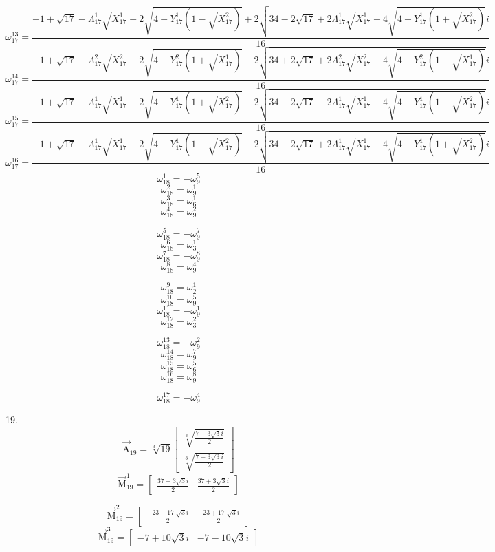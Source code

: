 \documentclass{article}
\begin{document}
\[ \omega_{17}^{13}=\frac{-1+\sqrt{17}+\Lambda_{17}^{1}\sqrt{X_{17}^{1}}-2\sqrt{4+Y_{17}^{1}(1-\sqrt{X_{17}^{2}})}+2\sqrt{34-2\sqrt{17}+2\Lambda_{17}^{1}\sqrt{X_{17}^{1}}-4\sqrt{4+Y_{17}^{1}(1+\sqrt{X_{17}^{2}})}}i}{16} \]
\[ \omega_{17}^{14}=\frac{-1+\sqrt{17}+\Lambda_{17}^{2}\sqrt{X_{17}^{2}}+2\sqrt{4+Y_{17}^{2}(1+\sqrt{X_{17}^{1}})}-2\sqrt{34+2\sqrt{17}+2\Lambda_{17}^{2}\sqrt{X_{17}^{2}}-4\sqrt{4+Y_{17}^{2}(1-\sqrt{X_{17}^{1}})}}i}{16} \]
\[ \omega_{17}^{15}=\frac{-1+\sqrt{17}-\Lambda_{17}^{1}\sqrt{X_{17}^{1}}+2\sqrt{4+Y_{17}^{1}(1+\sqrt{X_{17}^{2}})}-2\sqrt{34-2\sqrt{17}-2\Lambda_{17}^{1}\sqrt{X_{17}^{1}}+4\sqrt{4+Y_{17}^{1}(1-\sqrt{X_{17}^{2}})}}i}{16} \]
\[ \omega_{17}^{16}=\frac{-1+\sqrt{17}+\Lambda_{17}^{1}\sqrt{X_{17}^{1}}+2\sqrt{4+Y_{17}^{1}(1-\sqrt{X_{17}^{2}})}-2\sqrt{34-2\sqrt{17}+2\Lambda_{17}^{1}\sqrt{X_{17}^{1}}+4\sqrt{4+Y_{17}^{1}(1+\sqrt{X_{17}^{2}})}}i}{16} \]
\[ \omega_{18}^{1}=-\omega_{9}^{5} \]
\[ \omega_{18}^{2}=\omega_{9}^{1} \]
\[ \omega_{18}^{3}=\omega_{6}^{1} \]
\[ \omega_{18}^{4}=\omega_{9}^{2} \]

\[ \omega_{18}^{5}=-\omega_{9}^{7} \]
\[ \omega_{18}^{6}=\omega_{3}^{1} \]
\[ \omega_{18}^{7}=-\omega_{9}^{8} \]
\[ \omega_{18}^{8}=\omega_{9}^{4} \]

\[ \omega_{18}^{9}=\omega_{2}^{1} \]
\[ \omega_{18}^{10}=\omega_{9}^{5} \]
\[ \omega_{18}^{11}=-\omega_{9}^{1} \]
\[ \omega_{18}^{12}=\omega_{3}^{2} \]

\[ \omega_{18}^{13}=-\omega_{9}^{2} \]
\[ \omega_{18}^{14}=\omega_{9}^{7} \]
\[ \omega_{18}^{15}=\omega_{6}^{5} \]
\[ \omega_{18}^{16}=\omega_{9}^{8} \]

\[ \omega_{18}^{17}=-\omega_{9}^{4} \]

19.
\[ \vec{\mathrm{A}}_{19}=\sqrt[3]{19}\left[ \begin{matrix} \sqrt[3]{\frac{7+3\sqrt{3}i}{2}} \\ \sqrt[3]{\frac{7-3\sqrt{3}i}{2}} \end{matrix} \right] \]
\[ \vec{\mathrm{M}}_{19}^{1}=\left[ \begin{matrix} \frac{37-3\sqrt{3}i}{2} & \frac{37+3\sqrt{3}i}{2} \end{matrix} \right] \]

\[ \vec{\mathrm{M}}_{19}^{2}=\left[ \begin{matrix} \frac{-23-17\sqrt[]{3}i}{2} & \frac{-23+17\sqrt[]{3}i}{2} \end{matrix} \right] \]
\[ \vec{\mathrm{M}}_{19}^{3}=\left[ \begin{matrix} -7+10\sqrt{3}i & -7-10\sqrt{3}i \end{matrix} \right] \]
\end{document}
